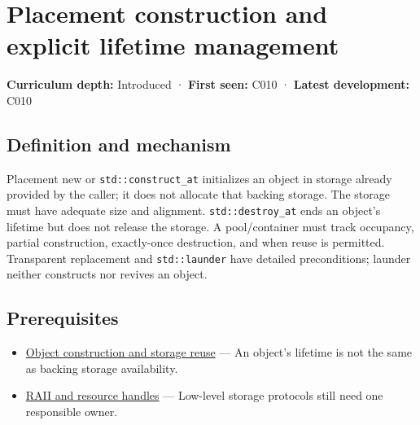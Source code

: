 \hypertarget{appendix-f56c3e43fd4e}{}\label{referencestart:appendix-f56c3e43fd4e}
\section{Placement construction and explicit lifetime management}\label{appendix-f56c3e43fd4e-placement-construction-and-explicit-lifetime-management}

\hypertarget{appendix-f56c3e43fd4e-placement-construction-and-explicit-lifetime-management}{}

\textbf{Curriculum depth:} Introduced · \textbf{First seen:} C010 · \textbf{Latest development:} C010

\begin{allmightroledefinition}

\subsection{Definition and mechanism}\label{appendix-f56c3e43fd4e-definition-and-mechanism}

\hypertarget{appendix-f56c3e43fd4e-definition-and-mechanism}{}

Placement new or \texttt{std::construct\_at} initializes an object in storage already provided by the caller; it does not allocate that backing storage. The storage must have adequate size and alignment. \texttt{std::destroy\_at} ends an object's lifetime but does not release the storage. A pool/container must track occupancy, partial construction, exactly-once destruction, and when reuse is permitted. Transparent replacement and \texttt{std::launder} have detailed preconditions; launder neither constructs nor revives an object.

\end{allmightroledefinition}

\subsection{Prerequisites}\label{appendix-f56c3e43fd4e-prerequisites}

\hypertarget{appendix-f56c3e43fd4e-prerequisites}{}

\begin{itemize}
\tightlist
\item
  \hyperref[appendix-a82f9c438857]{Object construction and storage reuse} --- An object's lifetime is not the same as backing storage availability.
\item
  \hyperref[appendix-69739d3ab49b]{RAII and resource handles} --- Low-level storage protocols still need one responsible owner.
\end{itemize}

